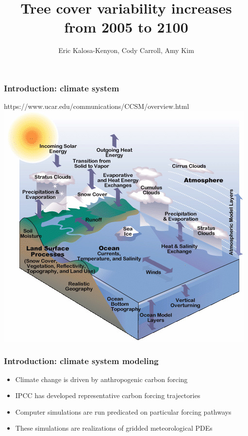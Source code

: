 \documentclass{beamer}
\title{Tree cover variability increases from 2005 to 2100}
\author{Eric Kalosa-Kenyon, Cody Carroll, Amy Kim}
\institute{University of California, Davis}
\date{}
\begin{document}
\frame{\titlepage}

\begin{frame}
    \frametitle{Introduction: climate system}
    https://www.ucar.edu/communications/CCSM/overview.html
    \includegraphics[width=\textwidth]{../img/ccsm_diagram_picture.jpeg}
\end{frame}

\begin{frame}
    \frametitle{Introduction: climate system modeling}
    \begin{itemize}
        \item Climate change is driven by anthropogenic carbon forcing
        \item IPCC has developed representative carbon forcing trajectories
        \item Computer simulations are run predicated on particular forcing
            pathways
        \item These simulations are realizations of gridded meteorological PDEs
    \end{itemize}
\end{frame}
\end{document}
